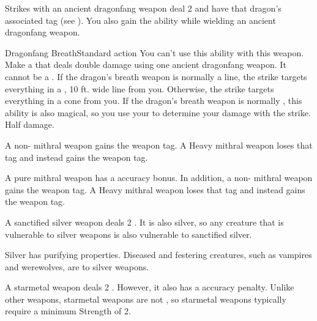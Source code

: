        Strikes with an ancient dragonfang weapon deal 2  and have that dragon's associated tag (see ).
      You also gain the  ability while wielding an ancient dragonfang weapon.
      \begin{activeability}{Dragonfang Breath}{Standard action}
        \abilitycost You \briefly can't use this ability with this weapon.
        \rankline
        Make a  that deals double damage using one ancient dragonfang weapon.
        It cannot be a .
        If the dragon's breath weapon is normally a line, the strike targets everything in a \arealarge, 10 ft. wide line from you.
        Otherwise, the strike targets everything in a \areamed cone from you.
        If the dragon's breath weapon is normally \magical, this ability is also magical, so you use your  to determine your damage with the strike.
        \miss Half damage.
      \end{activeability}

       A non- mithral weapon gains the  weapon tag.
      A Heavy mithral weapon loses that tag and instead gains the  weapon tag.

       A pure mithral weapon has a  accuracy bonus.
      In addition, a non- mithral weapon gains the  weapon tag.
      A Heavy mithral weapon loses that tag and instead gains the  weapon tag.

       A sanctified silver weapon deals 2 .
      It is also silver, so any creature that is vulnerable to silver weapons is also vulnerable to sanctified silver.

       Silver has purifying properties.
      Diseased and festering creatures, such as vampires and werewolves, are \vulnerable to silver weapons.

       A starmetal weapon deals 2 .
      However, it also has a  accuracy penalty.
      Unlike other weapons, starmetal weapons are not , so  starmetal weapons typically require a minimum Strength of 2.

